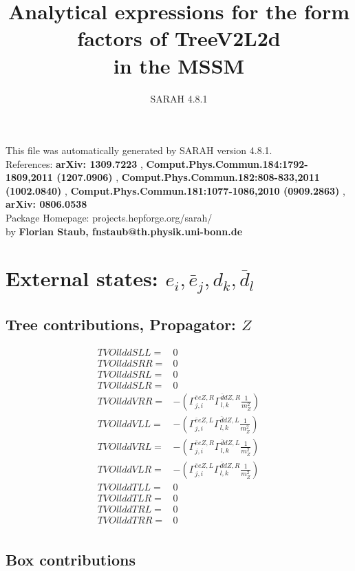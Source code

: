 \documentclass[A4,landscape]{article}
\begin{document}
\title{Analytical expressions for the form factors of TreeV2L2d\\ in the MSSM } 
 \author{SARAH 4.8.1} 
 \maketitle 
 \vspace{10cm} 
This file was automatically generated by SARAH version 4.8.1.  \\ 
References: {\bf arXiv: 1309.7223 }, {\bf Comput.Phys.Commun.184:1792-1809,2011 (1207.0906) }, {\bf Comput.Phys.Commun.182:808-833,2011 (1002.0840) }, {\bf Comput.Phys.Commun.181:1077-1086,2010 (0909.2863) }, {\bf arXiv: 0806.0538 } \\ 
Package Homepage: projects.hepforge.org/sarah/ \\ 
by {\bf Florian Staub, fnstaub@th.physik.uni-bonn.de} 
 \pagebreak 
 \tableofcontents 
 \pagebreak 
\section{External states: ${e_{{i}}, \bar{e}_{{j}}, d_{{k}}, \bar{d}_{{l}}}$} 
\subsection{Tree contributions, Propagator: $Z$} 

\begin{align} 
  TVOllddSLL= & 0 \\ 
  TVOllddSRR= & 0 \\ 
  TVOllddSRL= & 0 \\ 
  TVOllddSLR= & 0 \\ 
  TVOllddVRR= & -(\Gamma^{\bar{e}e Z ,R}_{j, i} \Gamma^{\bar{d}d Z ,R}_{l, k} \frac{1}{m^2_{Z}}) \\ 
  TVOllddVLL= & -(\Gamma^{\bar{e}e Z ,L}_{j, i} \Gamma^{\bar{d}d Z ,L}_{l, k} \frac{1}{m^2_{Z}}) \\ 
  TVOllddVRL= & -(\Gamma^{\bar{e}e Z ,R}_{j, i} \Gamma^{\bar{d}d Z ,L}_{l, k} \frac{1}{m^2_{Z}}) \\ 
  TVOllddVLR= & -(\Gamma^{\bar{e}e Z ,L}_{j, i} \Gamma^{\bar{d}d Z ,R}_{l, k} \frac{1}{m^2_{Z}}) \\ 
  TVOllddTLL= & 0 \\ 
  TVOllddTLR= & 0 \\ 
  TVOllddTRL= & 0 \\ 
  TVOllddTRR= & 0 \\ 
\end{align} 
\subsection{Box contributions} 
\end{document}
